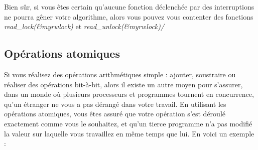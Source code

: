 \documentclass[11pt]{article}
\begin{document}
Bien sûr, si vous êtes certain qu'aucune fonction déclenchée par des interruptions ne pourra gêner votre algorithme, alors vous pouvez vous contenter des fonctions \emph{read\_lock(\&myrwlock)} et \emph{read\_unlock(\&myrwlock)/}

\subsection*{Opérations atomiques}
\label{sec-12-4}

Si vous réalisez des opérations arithmétiques simple : ajouter, soustraire ou réaliser des opérations bit-à-bit, alors il existe un autre moyen pour s'assurer, dans un monde où plusieurs processeurs et programmes tournent en concurrence, qu'un étranger ne vous a pas dérangé dans votre travail. En utilisant les opérations atomiques, vous êtes assuré que votre opération s'est déroulé exactement comme vous le souhaitez, et qu'un tierce programme n'a pas modifié la valeur sur laquelle vous travaillez en même temps que lui. En voici un exemple :
\end{document}
